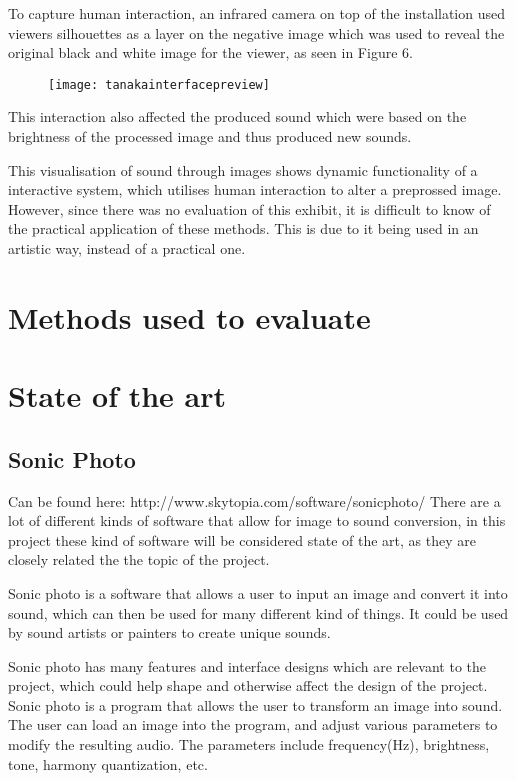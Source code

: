 To capture human interaction, an infrared camera on top of the installation used viewers silhouettes as a layer on the negative image which was used to reveal the original black and white image for the viewer, as seen in Figure 6.

\begin{figure}[!h]
\centering
\texttt{[image: tanakainterfacepreview]}
\caption{\label{fig:tanakainterfacepreview}}
\end{figure}


This interaction also affected the produced sound which were based on the brightness of the processed image and thus produced new sounds. 

This visualisation of sound through images shows dynamic functionality of a interactive system, which utilises human interaction to alter a preprossed image. However, since there was no evaluation of this exhibit, it is difficult to know of the practical application of these methods. This is due to it being used in an artistic way, instead of a practical one.   
 

\section{Methods used to evaluate}\label{sub:methodsusedtoevaluate}


\section{State of the art}\label{sec:stateart}

\subsection{Sonic Photo}\label{sub:sonic}
Can be found here: http://www.skytopia.com/software/sonicphoto/
There are a lot of different kinds of software that allow for image to sound conversion, in this project these kind of software will be considered state of the art, as they are closely related the the topic of the project. 

Sonic photo is a software that allows a user to input an image and convert it into sound, which can then be used for many different kind of things. It could be used by sound artists or painters to create unique sounds.

Sonic photo has many features and interface designs which are relevant to the project, which could help shape and otherwise affect the design of the project.
Sonic photo is a program that allows the user to transform an image into sound. The user can load an image into the program, and adjust various parameters to modify the resulting audio. The parameters include  frequency(Hz), brightness, tone, harmony quantization, etc.


